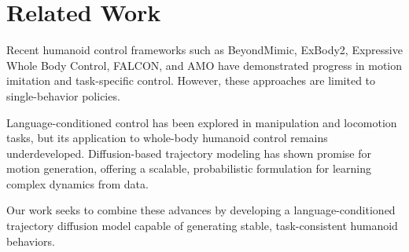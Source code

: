 \section{Related Work}
\label{sec:related-work}

Recent humanoid control frameworks such as BeyondMimic, ExBody2, Expressive Whole Body Control, FALCON, and AMO have demonstrated progress in motion imitation and task-specific control.
However, these approaches are limited to single-behavior policies.

Language-conditioned control has been explored in manipulation and locomotion tasks, but its application to whole-body humanoid control remains underdeveloped.
Diffusion-based trajectory modeling has shown promise for motion generation, offering a scalable, probabilistic formulation for learning complex dynamics from data.

Our work seeks to combine these advances by developing a language-conditioned trajectory diffusion model capable of generating stable, task-consistent humanoid behaviors.